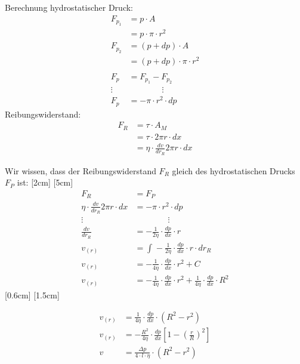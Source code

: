 \documentclass[a4paper,10pt]{article}
\begin{document}
Berechnung hydrostatischer Druck:
\begin{align*}
F_{p_1} &= p \cdot A \\
&= p \cdot \pi \cdot r^2 \\
F_{p_2} &= (p + dp) \cdot A \\ 
&= (p + dp) \cdot \pi \cdot r^2 \\ \\
F_p &= F_{p_1} - F_{p_2}\\
\vdots & \qquad \qquad \vdots \\
F_p &= -\pi \cdot r^2 \cdot dp
\end{align*}
Reibungswiderstand:
\begin{align*}
F_R &= \tau \cdot A_M  \\
&= \tau \cdot 2\pi r \cdot dx \\
&= \eta \cdot \frac{dv}{dr_R} 2\pi r \cdot dx
\end{align*} 
\ppbig









Wir wissen, dass der Reibungswiderstand $F_R$ gleich des hydrostatischen Drucks $F_P$ ist:
[2cm]
\marginnote[$C = \frac{1}{4 \eta} \cdot \frac{dp}{dx} \cdot R^2$]{}[5cm]
\begin{align*}
F_R &= F_P \\
\eta \cdot \frac{dv}{dr_R} 2\pi r \cdot dx &= -\pi \cdot r^2 \cdot dp \\
\vdots & \qquad \qquad \vdots \\
\frac{dv}{dr_R}  &= -\frac{1}{2\eta} \cdot \frac{dp}{dx} \cdot r \\
v_{(r)} &= \int_{}{} - \frac{1}{2\eta} \cdot \frac{dp}{dx} \cdot r \cdot dr_R \\
v_{(r)} &= -\frac{1}{4 \eta} \cdot \frac{dp}{dx} \cdot r^2  +C \\
v_{(r)} &= -\frac{1}{4 \eta} \cdot \frac{dp}{dx} \cdot r^2  +\frac{1}{4 \eta} \cdot \frac{dp}{dx} \cdot R^2 
\end{align*}
[0.6cm]
\marginnote[$l$ = Länge des Rohres \pp $v = 0$ wenn innerer Radius $r$ gleich Mantelradius $R$\pp $v(r=R)=0$]{}[1.5cm]
\begin{tcolorbox}[colback=petunidin!10,top=0pt,bottom=0pt,
	boxrule = 1pt, colframe=petunidin!60,coltitle=white, title= Gesetz von Stokes:, fonttitle=\bfseries, boxsep=2pt ]
\begin{align*}
v_{(r)} &= \frac{1}{4 \eta} \cdot \frac{dp}{dx} \cdot (R^2-r^2) \\
v_{(r)} &= -\frac{R^2}{4 \eta} \cdot \frac{dp}{dx} \left[1- (\frac{r}{R})^2 \right] \\
v		 &= \frac{\Delta p}{4 \cdot l \cdot \eta} \cdot (R^2 - r^2) \\
\end{align*}
\end{tcolorbox}
\end{document}
